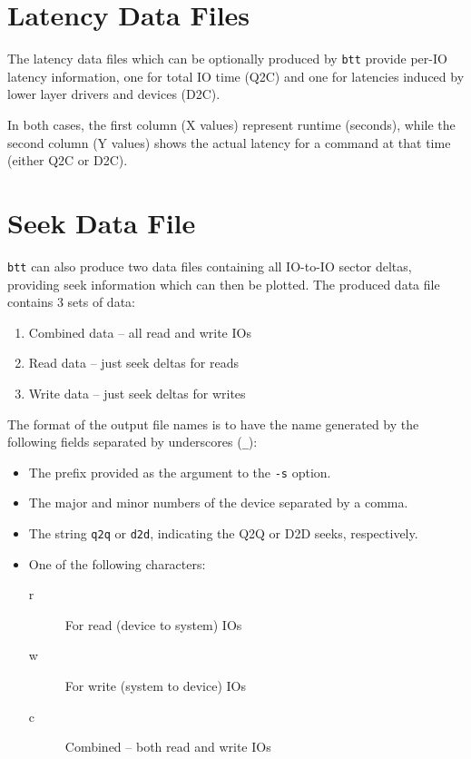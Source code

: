 \documentclass{article}
\begin{document}
\newpage\section{\label{sec:lat}\label{sec:lat-q2c}\label{sec:lat-d2c}Latency Data Files}

  The latency data files which can be optionally produced by \texttt{btt}
  provide per-IO latency information, one for total IO time (Q2C) and
  one for latencies induced by lower layer drivers and devices (D2C).

  In both cases, the first column (X values) represent runtime (seconds),
  while the second column (Y values) shows the actual latency for a
  command at that time (either Q2C or D2C).

\newpage\section{\label{sec:seek}Seek Data File}

  \texttt{btt} can also produce two data files containing all IO-to-IO sector
  deltas, providing seek information which can then be plotted. The
  produced data file contains 3 sets of data:

  \begin{enumerate}
     \item Combined data -- all read and write IOs

     \item Read data -- just seek deltas for reads

     \item Write data -- just seek deltas for writes
  \end{enumerate}

  The format of the output file names is to have the name generated by 
  the following fields separated by underscores (\texttt{\_}):
  
  \begin{itemize}
    \item The prefix provided as the argument to the \texttt{-s} option.
    \item The major and minor numbers of the device separated by a comma.
    \item The string \texttt{q2q} or \texttt{d2d}, indicating the Q2Q or 
          D2D seeks, respectively.
    \item One of the following characters:
    	\begin{description}
	  \item[r] For read (device to system) IOs
	  \item[w] For write (system to device) IOs
	  \item[c] Combined -- both read and write IOs
	\end{description}
  \end{itemize}
\end{document}
